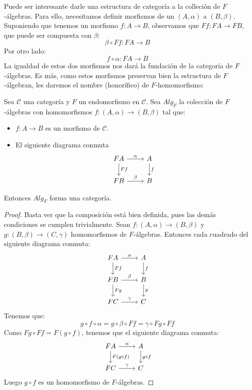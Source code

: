 \documentclass[12pt, twoside]{book}
\newcommand{\cat}{{\mathcal{C}}}
\begin{document}
Puede ser interesante darle una estructura de categoría a la colleción de $F$-álgebras.
Para ello, necesitamos definir morfismos de un $(A,\alpha)$ a $(B,\beta)$.
Suponiendo que tenemos un morfismo $f \colon A \to B$, observamos que $F f \colon F A \to F B$, que puede ser compuesta con $\beta$:
\[ \beta \circ F f \colon F A \to B \]
Por otro lado:
\[ f \circ \alpha \colon F A \to B \]
La igualdad de estos dos morfismos nos dará la fundación de la categoría de $F$-álgebras.
Es más, como estos morfismos preservan bien la estructura de $F$-álgebran, les daremos el nombre (honorífico) de $F$-homomorfismo:

\begin{proposition}\label{prop:fmorfismo}
Sea $\cat$ una categoría y $F$ un endomorfismo en $\cat$.
Sea $Alg_F$ la colección de $F$-álgebras con homomorfismos $f \colon (A,\alpha) \to (B,\beta)$ tal que:
\begin{itemize}
\item $f \colon A \to B$ es un morfismo de $\cat$.
\item El siguiente diagrama conmuta
\[
\begin{tikzcd}
F A \arrow[r,"\alpha"] \arrow[d,"F f"] & A \arrow[d,"f"]\\
F B \arrow[r,"\beta"] & B
\end{tikzcd}
\]
\end{itemize}
Entonces $Alg_F$ forma una categoría.
\end{proposition}
\begin{proof}
Basta ver que la composición está bien definida, pues las demás condiciones se cumplen trivialmente.
Sean $f \colon (A,\alpha) \to (B,\beta)$ y $g \colon (B,\beta) \to (C,\gamma)$ homomorfismos de $F$-álgebras.
Entonces cada cuadrado del siguiente diagrama conmuta:
\[
\begin{tikzcd}
F A \arrow[r,"\alpha"] \arrow[d,"F f"] & A \arrow[d,"f"]\\
F B \arrow[r,"\beta"] \arrow[d,"F g"] & B \arrow[d,"g"]\\
F C \arrow[r,"\gamma"] & C
\end{tikzcd}
\]
Tenemos que:
\[ g \circ f \circ \alpha = g \circ \beta \circ F f = \gamma \circ F g \circ F f \]
Como $F g \circ F f = F (g \circ f)$, tenemos que el siguiente diagrama conmuta:
\[
\begin{tikzcd}
F A \arrow[r,"\alpha"] \arrow[d,"F (g \circ f)"] & A \arrow[d,"g \circ f"]\\
F C \arrow[r,"\gamma"] & C
\end{tikzcd}
\]
Luego $g \circ f$ es un homomorfismo de $F$-álgebras.
\end{proof}
\end{document}
